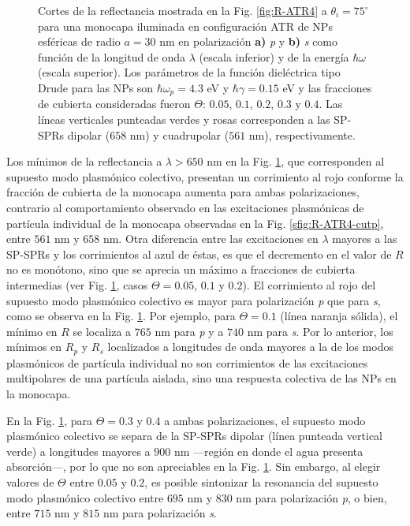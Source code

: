 \begin{figure}[h!]
	\caption{
Cortes de la reflectancia mostrada en la Fig. \ref{fig:R-ATR4} a $\theta_i = 75^\circ$ para una monocapa iluminada en configuración ATR de NPs esféricas de radio $a=30$ nm en polarización \textbf{a)} \emph{p} y \textbf{b)} \emph{s} como función de la longitud de onda $\lambda$ (escala inferior) y de la energía $\hbar\omega$ (escala superior). Los parámetros de la función dieléctrica tipo Drude para las NPs son $\hbar\omega_p = 4.3$ eV y $\hbar\gamma = 0.15$ eV y las fracciones de cubierta consideradas fueron $\Theta$: $0. 05$, $0. 1$, $0. 2$, $0. 3$ y $0. 4$. Las líneas verticales punteadas verdes y rosas corresponden a las SP-SPRs dipolar ($658$ nm) y cuadrupolar ($561$ nm), respectivamente. }\label{fig:R-ATR4-Cuts}
	\end{figure}

Los mínimos de la reflectancia a $\lambda>650$ nm en la Fig. \ref{fig:R-ATR4-Cuts}, que corresponden al supuesto modo plasmónico colectivo, presentan un corrimiento al rojo conforme la fracción de cubierta de la monocapa aumenta  para ambas polarizaciones, contrario al comportamiento observado en las excitaciones plasmónicas de partícula individual de la monocapa observadas en la Fig. \ref{sfig:R-ATR4-cutp}, entre $561$ nm y $658$ nm. Otra diferencia entre las excitaciones en $\lambda$ mayores a las SP-SPRs y los corrimientos al azul de éstas, es que el decremento en el valor de $R$ no es monótono, sino que se aprecia un máximo a fracciones de cubierta intermedias (ver Fig. \ref{fig:R-ATR4-Cuts}, casos $\Theta=0.05$, $0.1$ y $0.2$). El corrimiento al rojo del supuesto modo plasmónico colectivo es mayor para  polarización \emph{p} que para \emph{s}, como se observa en la Fig. \ref{fig:R-ATR4-Cuts}. Por ejemplo, para $\Theta=0.1$ (línea naranja sólida), el mínimo en $R$ se localiza a $765$ nm para \emph{p} y  a $740$ nm para \emph{s}. Por lo anterior, los mínimos en $R_p$ y $R_s$ localizados a longitudes de onda mayores a la de los modos plasmónicos de partícula individual no son corrimientos de las excitaciones multipolares de una partícula aislada, sino una respuesta colectiva de las NPs en la monocapa. 

En la Fig. \ref{fig:R-ATR4-Cuts}, para $\Theta = 0.3$ y $0.4$ a ambas polarizaciones, el supuesto modo plasmónico colectivo se separa de la SP-SPRs dipolar (línea punteada vertical verde) a longitudes mayores a $900$ nm ---región en donde el agua presenta absorción---, por lo que 
no son apreciables en la Fig. \ref{fig:R-ATR4-Cuts}. Sin embargo, al elegir valores de $\Theta$ entre $0.05$ y $0.2$, es posible sintonizar la resonancia del supuesto modo plasmónico colectivo entre $695$ nm y $830$ nm para polarización \emph{p}, o bien, entre $715$ nm y $815$ nm para polarización \emph{s}. 

